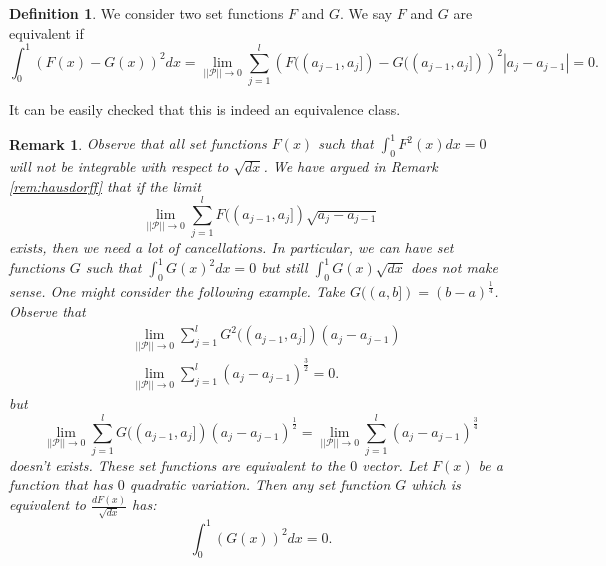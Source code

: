 \documentclass[reqno,12pt]{amsart}
\theoremstyle{plain}
\newtheorem{remark}{Remark}
\theoremstyle{definition}
\newtheorem{definition}{Definition}
\begin{document}
\begin{definition}\label{def:equivalence}
    We consider two set functions $F$ and $G$.
    We say $F$ and $G$ are equivalent if
    \[
      \int_{0}^{1} (F(x)-G(x))^2 dx= \lim_{||\mathcal{P}||\to 0} \sum_{j=1}^{l} \left(F((a_{j-1},a_{j}])-G((a_{j-1},a_{j}])\right)^{2} |a_{j}-a_{j-1}|= 0. 
    \]
\end{definition}
It can be easily checked that this is indeed an equivalence class.
\begin{remark}\label{rem:intequi}
 Observe that all set functions $F(x)$ such that $\int_{0}^{1} F^{2}(x)dx=0$ will not be integrable with respect to $\sqrt{dx}$. We have argued in Remark \ref{rem:hausdorff} that if the limit 
 \[
\lim_{||\mathcal{P}||\to 0} \sum_{j=1}^{l} F((a_{j-1},a_{j}]) \sqrt{a_{j}-a_{j-1}}
 \]
 exists, then we need a lot of cancellations.  In particular, we can have set functions $G$ such that $\int_{0}^{1} G(x)^{2}dx=0$ but still $\int_{0}^{1}G(x)\sqrt{dx}$ does not make sense.
One might consider the following example. Take $G((a,b])=(b-a)^{\frac{1}{4}}$. Observe that
\begin{equation}
\begin{split}
 &\lim_{||\mathcal{P}||\to 0} \sum_{j=1}^{l}G^{2}((a_{j-1},a_{j}])(a_{j}-a_{j-1})\\
 & \lim_{||\mathcal{P}||\to 0} \sum_{j=1}^{l} (a_{j}-a_{j-1})^{\frac{3}{2}} =0.
\end{split}
\end{equation}
but 
\[
\lim_{||\mathcal{P}||\to 0} \sum_{j=1}^{l}G((a_{j-1},a_{j}])(a_{j}-a_{j-1})^{\frac{1}{2}} = \lim_{||\mathcal{P}||\to 0}\sum_{j=1}^{l} (a_{j}-a_{j-1})^{\frac{3}{4}}
\]
doesn't exists. These set functions are equivalent to the $0$ vector. Let $F(x)$ be a function that has $0$ quadratic variation. Then any set function $G$ which is equivalent to $\frac{dF(x)}{\sqrt{dx}}$ has:
\[
\int_{0}^{1} \left( G(x) \right)^{2} dx= 0.
\]  %
\end{remark}
 
\end{document}
